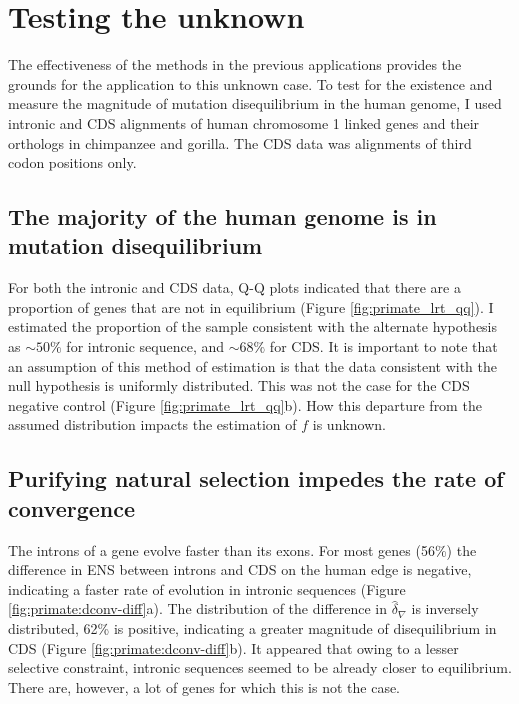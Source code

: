 \section{Testing the unknown}

The effectiveness of the methods in the previous applications provides the grounds for the application to this unknown case. To test for the existence and measure the magnitude of mutation disequilibrium in the human genome, I used intronic and CDS alignments of human chromosome 1 linked genes and their orthologs in chimpanzee and gorilla. The CDS data was alignments of third codon positions only. 

\subsection{The majority of the human genome is in mutation disequilibrium}
\label{Human:TOE}
For both the intronic and CDS data, Q-Q plots indicated that there are a proportion of genes that are not in equilibrium (Figure \ref{fig:primate_lrt_qq}). I estimated the proportion of the sample consistent with the alternate hypothesis as $\sim50\%$ for intronic sequence, and $\sim68\%$ for CDS. It is important to note that an assumption of this method of estimation is that the data consistent with the null hypothesis is uniformly distributed. This was not the case for the CDS negative control (Figure \ref{fig:primate_lrt_qq}b). How this departure from the assumed distribution impacts the estimation of $f$ is unknown. 



\subsection{Purifying natural selection impedes the rate of convergence}

The introns of a gene evolve faster than its exons. For most genes (56\%) the difference in ENS between introns and CDS on the human edge is negative, indicating a faster rate of evolution in intronic sequences (Figure \ref{fig:primate:dconv-diff}a). The distribution of the difference in $\hat\delta_\nabla$ is inversely distributed, 62\% is positive, indicating a greater magnitude of disequilibrium in CDS (Figure \ref{fig:primate:dconv-diff}b). It appeared that owing to a lesser selective constraint, intronic sequences seemed to be already closer to equilibrium. There are, however, a lot of genes for which this is not the case.

